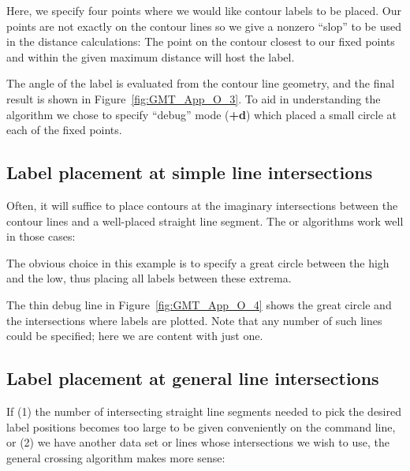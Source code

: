 Here, we specify four points where we would like contour labels to be placed.  Our points
are not exactly on the contour lines so we give a nonzero ``slop'' to be used in the
distance calculations: The point on the contour closest to our fixed points and within
the given maximum distance will host the label.



\noindent
The angle of the label is evaluated from the contour line geometry, and the final result
is shown in Figure~\ref{fig:GMT_App_O_3}.
To aid in understanding the algorithm we chose to specify ``debug'' mode ({\bf +d}) which placed a
small circle at each of the fixed points.

\subsection{Label placement at simple line intersections}

Often, it will suffice to place contours at the imaginary intersections between the
contour lines and a well-placed straight line segment.  The  or 
algorithms work well in those cases:



\noindent
The obvious choice in this example is to specify a great circle between the high and
the low, thus placing all labels between these extrema.

\noindent
The thin debug line in Figure~\ref{fig:GMT_App_O_4} shows the great circle and the
intersections where labels are plotted.  Note that any number of such lines could be specified;
here we are content with just one.

\subsection{Label placement at general line intersections}

If (1) the number of intersecting straight line segments needed to pick the desired label
positions becomes too large to be given conveniently on the command line, or (2) we have
another data set or lines whose intersections we wish to use, the general crossing
algorithm makes more sense:

